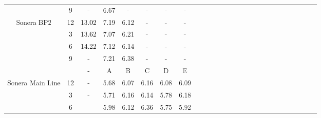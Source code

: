 \begin{table}[h]
{\begin{tabular}{l|l|l|l|l|l|l|lllllllllllllllllll}
			\multicolumn{1}{c|}{} & \multicolumn{1}{c|}{9} & \multicolumn{1}{c|}{-} & \multicolumn{1}{c|}{6.67} & \multicolumn{1}{c|}{-} & \multicolumn{1}{c|}{-} & \multicolumn{1}{c|}{-} & \multicolumn{1}{c}{-} &  &  &  &  &  &  &  &  &  &  &  &  &  &  &  &  &  &  \\ 
			\cline{1-8}
			\multicolumn{1}{c|}{Sonera BP2} & \multicolumn{1}{c|}{12} & \multicolumn{1}{c|}{13.02} & \multicolumn{1}{c|}{7.19} & \multicolumn{1}{c|}{6.12} & \multicolumn{1}{c|}{-} & \multicolumn{1}{c|}{-} & \multicolumn{1}{c}{-} &  &  &  &  &  &  &  &  &  &  &  &  &  &  &  &  &  &  \\ 
			\multicolumn{1}{c|}{} & \multicolumn{1}{c|}{3} & \multicolumn{1}{c|}{13.62} & \multicolumn{1}{c|}{7.07} & \multicolumn{1}{c|}{6.21} & \multicolumn{1}{c|}{-} & \multicolumn{1}{c|}{-} & \multicolumn{1}{c}{-} &  &  &  &  &  &  &  &  &  &  &  &  &  &  &  &  &  &  \\ 
			\multicolumn{1}{c|}{} & \multicolumn{1}{c|}{6} & \multicolumn{1}{c|}{14.22} & \multicolumn{1}{c|}{7.12} & \multicolumn{1}{c|}{6.14} & \multicolumn{1}{c|}{-} & \multicolumn{1}{c|}{-} & \multicolumn{1}{c}{-} &  &  &  &  &  &  &  &  &  &  &  &  &  &  &  &  &  &  \\ 
			\multicolumn{1}{c|}{} & \multicolumn{1}{c|}{9} & \multicolumn{1}{c|}{-} & \multicolumn{1}{c|}{7.21} & \multicolumn{1}{c|}{6.38} & \multicolumn{1}{c|}{-} & \multicolumn{1}{c|}{-} & \multicolumn{1}{c}{-} &  &  &  &  &  &  &  &  &  &  &  &  &  &  &  &  &  &  \\ 
			\cline{1-8}
			\multicolumn{1}{c|}{} & \multicolumn{1}{c|}{} & \multicolumn{1}{c|}{-} & \multicolumn{1}{c|}{A} & \multicolumn{1}{c|}{B} & \multicolumn{1}{c|}{C} & \multicolumn{1}{c|}{D} & \multicolumn{1}{c}{E} &  &  &  &  &  &  &  &  &  &  &  &  &  &  &  &  &  &  \\ 
			\cline{1-8}
			\multicolumn{1}{c|}{Sonera Main Line} & \multicolumn{1}{c|}{12} & \multicolumn{1}{c|}{-} & \multicolumn{1}{c|}{5.68} & \multicolumn{1}{c|}{6.07} & \multicolumn{1}{c|}{6.16} & \multicolumn{1}{c|}{6.08} & \multicolumn{1}{c}{6.09} &  &  &  &  &  &  &  &  &  &  &  &  &  &  &  &  &  &  \\ 
			\multicolumn{1}{c|}{} & \multicolumn{1}{c|}{3} & \multicolumn{1}{c|}{-} & \multicolumn{1}{c|}{5.71} & \multicolumn{1}{c|}{6.16} & \multicolumn{1}{c|}{6.14} & \multicolumn{1}{c|}{5.78} & \multicolumn{1}{c}{6.18} &  &  &  &  &  &  &  &  &  &  &  &  &  &  &  &  &  &  \\ 
			\multicolumn{1}{c|}{} & \multicolumn{1}{c|}{6} & \multicolumn{1}{c|}{-} & \multicolumn{1}{c|}{5.98} & \multicolumn{1}{c|}{6.12} & \multicolumn{1}{c|}{6.36} & \multicolumn{1}{c|}{5.75} & \multicolumn{1}{c}{5.92} &  &  &  &  &  &  &  &  &  &  &  &  &  &  &  &  &  &  \\ 

\end{tabular}}
\end{table}
